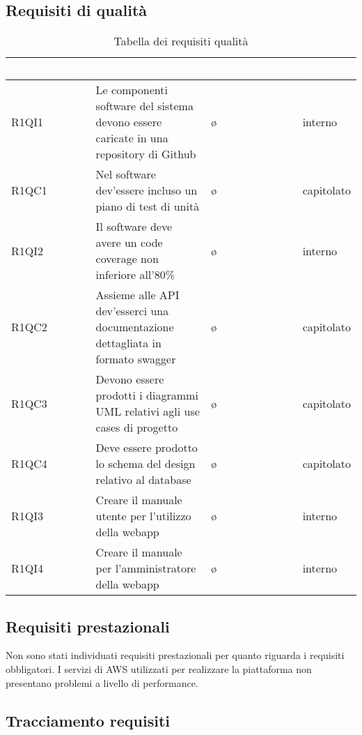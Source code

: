 \subsection{Requisiti di qualità}
    \renewcommand{\arraystretch}{1.5}

    \begin{longtable}{ l p{7cm} l p{3cm}}
        \caption{Tabella dei requisiti qualità}\\
        \rowcolor{darkblue}
        \textcolor{white}{Identificativo} & \textcolor{white}{Descrizione} & \textcolor{white}{Classificazione} & \textcolor{white}{Fonti}\\	
        \endfirsthead
        \rowcolor{darkblue}
        \endhead
        R1QI1 & Le componenti software del sistema devono essere caricate in una repository di Github & \o & interno\\
        R1QC1 & Nel software dev'essere incluso un piano di test di unità & \o & capitolato\\
        R1QI2 & Il software deve avere un code coverage non inferiore all'80\% & \o & interno\\
        R1QC2 & Assieme alle API dev'esserci una documentazione dettagliata in formato swagger & \o & capitolato\\
        R1QC3 & Devono essere prodotti i diagrammi UML relativi agli use cases di progetto & \o & capitolato\\
        R1QC4 & Deve essere prodotto lo schema del design relativo al database & \o & capitolato\\
        R1QI3 & Creare il manuale utente per l'utilizzo della webapp & \o & interno\\
        R1QI4 & Creare il manuale per l'amministratore della webapp & \o & interno\\

    \end{longtable}

\subsection{Requisiti prestazionali}
    Non sono stati individuati requisiti prestazionali per quanto riguarda i requisiti obbligatori. I servizi di AWS utilizzati per realizzare la piattaforma non presentano problemi a livello di performance.
\subsection{Tracciamento requisiti}